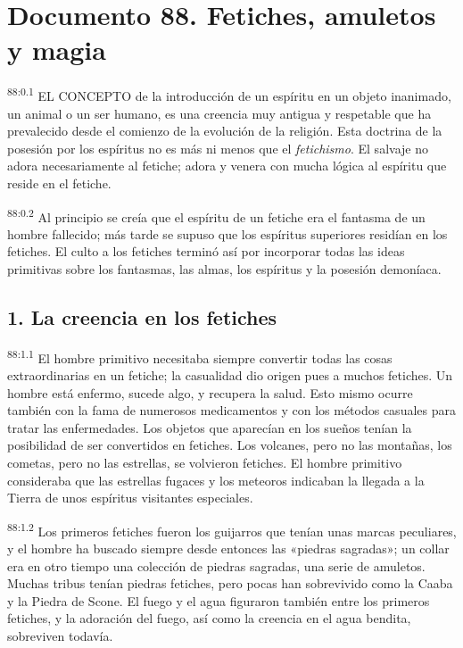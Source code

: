 \chapter{Documento 88. Fetiches, amuletos y magia}
\par
\textsuperscript{88:0.1} EL CONCEPTO de la introducción de un espíritu en un objeto inanimado, un animal o un ser humano, es una creencia muy antigua y respetable que ha prevalecido desde el comienzo de la evolución de la religión. Esta doctrina de la posesión por los espíritus no es más ni menos que el \textit{fetichismo}. El salvaje no adora necesariamente al fetiche; adora y venera con mucha lógica al espíritu que reside en el fetiche.

\par
\textsuperscript{88:0.2} Al principio se creía que el espíritu de un fetiche era el fantasma de un hombre fallecido; más tarde se supuso que los espíritus superiores residían en los fetiches. El culto a los fetiches terminó así por incorporar todas las ideas primitivas sobre los fantasmas, las almas, los espíritus y la posesión demoníaca.

\section*{1. La creencia en los fetiches}
\par
\textsuperscript{88:1.1} El hombre primitivo necesitaba siempre convertir todas las cosas extraordinarias en un fetiche; la casualidad dio origen pues a muchos fetiches. Un hombre está enfermo, sucede algo, y recupera la salud. Esto mismo ocurre también con la fama de numerosos medicamentos y con los métodos casuales para tratar las enfermedades. Los objetos que aparecían en los sueños tenían la posibilidad de ser convertidos en fetiches. Los volcanes, pero no las montañas, los cometas, pero no las estrellas, se volvieron fetiches. El hombre primitivo consideraba que las estrellas fugaces y los meteoros indicaban la llegada a la Tierra de unos espíritus visitantes especiales.

\par
\textsuperscript{88:1.2} Los primeros fetiches fueron los guijarros que tenían unas marcas peculiares, y el hombre ha buscado siempre desde entonces las «piedras sagradas»; un collar era en otro tiempo una colección de piedras sagradas, una serie de amuletos. Muchas tribus tenían piedras fetiches, pero pocas han sobrevivido como la Caaba y la Piedra de Scone. El fuego y el agua figuraron también entre los primeros fetiches, y la adoración del fuego, así como la creencia en el agua bendita, sobreviven todavía.

